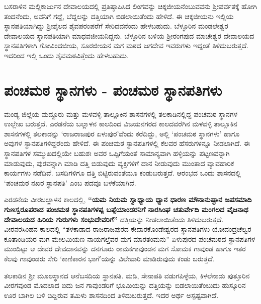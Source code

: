 ಬಸರಾಳಿನ ಮಲ್ಲಿಕಾರ್ಜುನ ದೇವಾಲಯದಲ್ಲಿ ಪ್ರತಿಷ್ಠಾಪಿಸಿದ ಲಿಂಗವನ್ನು ಚಿಕ್ಕಜೀಯನೆಂಬುವವನು ಶ‍್ರೀಪರ್ವತಕ್ಕೆ ಹೋಗಿ ತಂದನೆಂದು, ಅವನಿಗೆ ಗದ್ದೆ, ಬೆದ್ದಲನ್ನು ದತ್ತಿಯಾಗಿ ಬಿಡಲಾಯಿತೆಂದು ಹೇಳಿದೆ. ಈ ಚಿಕ್ಕಜೀಯನು ಇಲ್ಲಿಯ ಸ್ಥಾನಪತಿಯಾಗಿದ್ದು ಶ‍್ರೀಶೈಲದ ಶೈವಪರಂಪರೆಗೆ ಸೇರಿದವನೆಂದು ಹೇಳಬಹುದು. ಬೆಳ್ಳೂರಿನ ಮಂಡಲೇಶ್ವರ ದೇವಾಲಯದ ಸ್ಥಾನಪತಿಯಾಗಿ ಮಾಧವಜೀಯನಿದ್ದನು. ಬೆಳ್ಳೂರಿನ ಬಳಿಯ ಶ‍್ರೀರಂಗಪುದ ಮಾಚೇಶ್ವರ ದೇವಾಲಯದ ಸ್ಥಾನಪತಿಗಳಾಗಿ ಗೋವಿಂದಜೀಯ, ಸೂರಜೀಯನ ಮಗ ಮಠದ ಜಗದೇವ ಇವರುಗಳು ಇದ್ದಂತೆ ತಿಳಿದುಬರುತ್ತದೆ. ಇದರಿಂದ ಇಲ್ಲಿ ಒಂದು ಶೈವಮಠವಿತ್ತೆಂದು ಹೇಳಬಹುದು.

\section*{ಪಂಚಮಠ ಸ್ಥಾನಗಳು - ಪಂಚಮಠ ಸ್ಥಾನಪತಿಗಳು}

ಮಂಡ್ಯ ಜಿಲ್ಲೆಯ ಮದ್ದೂರು ಮತ್ತು ಮಳವಳ್ಳಿ ತಾಲ್ಲೂಕಿನ ಶಾಸನಗಳಲ್ಲಿ ತಲಕಾಡಿನಲ್ಲಿದ್ದ ಪಂಚಮಠ ಸ್ಥಾನಗಳ ಉಲ್ಲೇಖ ಬರುತ್ತದೆ. ಎರಡನೆಯ ಬಲ್ಲಾಳನ ಕಾಲದಿಂದ ವಿಜಯನಗರದ ಕಾಲದವರೆಗಿನ ಮಳವಳ್ಳಿ ತಾಲ್ಲೂಕಿನ ಶಾಸನಗಳಲ್ಲಿ ತಲಕಾಡನ್ನು ‘ರಾಜರಾಜಪುರ ಏಳುಪುರ’ವೆಂದು ಕರೆದಿದ್ದು, ಅಲ್ಲಿ ‘ಪಂಚಮಠ ಸ್ಥಾನಗಳು’ ಹಾಗೂ ಅವುಗಳ ಸ್ಥಾನಪತಿಗಳಿದ್ದರೆಂದು ಹೇಳಿದೆ. ಈ ಪಂಚಮಠ ಸ್ಥಾನಪತಿಗಳಲ್ಲಿ ಕೆಲವರ ಹೆಸರುಗಳನ್ನೂ ನೀಡಲಾಗಿದೆ. ಈ ಸ್ಥಾನಪತಿಗಳ ಸಮ್ಮುಖದಲ್ಲಿಯೇ ಬಹುಶಃ ಅವರ ಒಪ್ಪಿಗೆಯಂತೆ ಸಾಮಾನ್ಯವಾಗಿ ಹಳ್ಳಿಯನ್ನು ಪಟ್ಟಣವನ್ನಾಗಿ ಮಾಡುವುದು, ಪುರವನ್ನಾಗಿ ಮಾಡಿ ದತ್ತಿ ಬಿಡುವುದು ವ್ಯಕ್ತಿಗಳಿಗೆ ದಾನ ನೀಡುವುದು ಮುಂತಾದ ವ್ಯಾವಹಾರಿಕ ಕಾರ್ಯಗಳು ನಡೆದಿವೆ. ಬಸದಿಗಳಿಗೂ ದತ್ತಿ ಬಿಟ್ಟಿರುವಂತೆಯೂ ಕಂಡುಬರುತ್ತದೆ. ಆರಂಭದ ಒಂದು ಶಾಸನದಲ್ಲಿ ‘ಪಂಚಮಠ ನಖರ ಸ್ಥಾನಪತಿ’ ಎಂಬ ಪದವೂ ಬಳಕೆಯಾಗಿದೆ.

ಎರಡನೆಯ ವೀರಬಲ್ಲಾಳನ ಕಾಲದಲ್ಲಿ, \textbf{“ಯಮ ನಿಯಮ ಸ್ವಾಧ್ಯಾಯ ಧ್ಯಾನ ಧಾರಣ ಮೌನಾನುಷ್ಟಾನ ಜಪಸಮಾದಿ ಗುಣಸ್ವರೂಪರಾದ ಪಂಚಮಠ ಸ್ಥಾನಪತಿಗಳಪ್ಪ ಬಪ್ಪೆಯಾಂಡರನಿಗೆ ನಾರಸಿಂಘ ಚತುರ್ವೇದಿ ಮಂಗಲದ ವೈಜನಾಥ ದೇವಾಲ\-ಯದ ಹಿರಿಯ ಗುರುಗಳು ಸಂಭುದೇವರಿಗೆ”} ದತ್ತಿಯನ್ನು ನೀಡಲಾಯಿತೆಂದು ತಿಳಿದುಬರುತ್ತದೆ. ವೀರನರಸಿಂಹನ ಕಾಲದಲ್ಲಿ “ತಳಕಾಡಾದ ರಾಜರಾಜಪುರದ ಕೇದಾರಕೊಂಡೇಶ್ವರದ ಸ್ಥಾನಪತಿಗಳು ಯೋದಂದ್ರಚೆಲ್ವರ ಕೂತಾಂಡಿಯರ ಮಗ ಮೇಲಮಿಯಣ ನಾಯಗಲ್ತೆವರ ಮಗ ಮಾರತಂಮನು” ಏಳುಪುರದ ಪಂಚಮಠದ ಸ್ಥಾನಪತಿಗಳ ಮುಂದಿಟ್ಟು ಆ ದೇವರ ದೇವದಾನವನ್ನು ದನಗೂರು ರಾಮಕಗಾವುಂಡನ ಮಗ ಸೋಮಕ ಗಾವುಂಡ ಹಾಗೂ ಇತರ ಕೆಲವು ಗಾವುಂಡರು ಸೇರಿ ‘ಕಾಣಿಕಾರನ ಭಾಗೆ’ಯನ್ನು ವಿಲೇವಾರಿ ಮಾಡಿರುವುದು ಕಂಡು ಬರುತ್ತದೆ.

ತಲಕಾಡಿನ ಶ‍್ರೀ ಮೂಲಸ್ಥಾನದ ಆನೆಬಸದಿಯ ಸ್ಥಾನಪತಿ. ಮಡಿ, ಸೇನಾಪತಿ ವಡುಗಪಿಳ್ಳೆಯ, ಕಿಳಲೆನಾಡು ಪುತ್ತೂರಿನ ವೀರಗವುಂಡ ಮೊದಲಾದ ಐದು ಜನ ಗಾವುಂಡರಿಗೆ ಭೂಮಿಯನ್ನು ದತ್ತಿಯನ್ನು ಬಿಡಲಾಯಿತೆಂಬುದು ಹುಸ್ಕೂರಿನ ಊರ ಬಾಗಿಲ ಬಳಿ ಬಿದ್ದಿರುವ ತಮಿಳು ಶಾಸನದಿಂದ ತಿಳಿದುಬರುತ್ತದೆ. ಇದರ ಅರ್ಥ ಅಸ್ಪಷ್ಟವಾಗಿದೆ.

